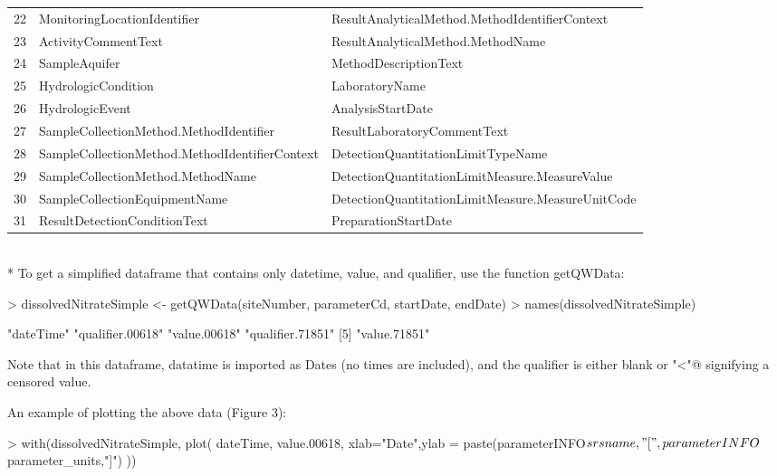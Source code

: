 \documentclass[a4paper,11pt]{article}
\begin{document}
\begin{tabular}{rll}
  22 & MonitoringLocationIdentifier & ResultAnalyticalMethod.MethodIdentifierContext \\ 
  23 & ActivityCommentText & ResultAnalyticalMethod.MethodName \\ 
  24 & SampleAquifer & MethodDescriptionText \\ 
  25 & HydrologicCondition & LaboratoryName \\ 
  26 & HydrologicEvent & AnalysisStartDate \\ 
  27 & SampleCollectionMethod.MethodIdentifier & ResultLaboratoryCommentText \\ 
  28 & SampleCollectionMethod.MethodIdentifierContext & DetectionQuantitationLimitTypeName \\ 
  29 & SampleCollectionMethod.MethodName & DetectionQuantitationLimitMeasure.MeasureValue \\ 
  30 & SampleCollectionEquipmentName & DetectionQuantitationLimitMeasure.MeasureUnitCode \\ 
  31 & ResultDetectionConditionText & PreparationStartDate \\ 
   \hline
\end{tabular}
\\*
To get a simplified dataframe that contains only datetime, value, and qualifier, use the function getQWData:

\begin{Schunk}
\begin{Sinput}
> dissolvedNitrateSimple <- getQWData(siteNumber, parameterCd, 
         startDate, endDate)
> names(dissolvedNitrateSimple)
\end{Sinput}
\begin{Soutput}
[1] "dateTime"        "qualifier.00618" "value.00618"     "qualifier.71851"
[5] "value.71851"    
\end{Soutput}
\end{Schunk}
Note that in this dataframe, datatime is imported as Dates (no times are included), and the qualifier is either blank or \verb@"<"@ signifying a censored value.

An example of plotting the above data (Figure 3):

\begin{Schunk}
\begin{Sinput}
> with(dissolvedNitrateSimple, plot(
   dateTime, value.00618,
   xlab="Date",ylab = paste(parameterINFO$srsname,
       "[",parameterINFO$parameter_units,"]")
   ))
\end{Sinput}
\end{Schunk}
\end{document}

